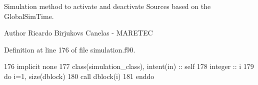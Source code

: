 Simulation method to activate and deactivate Sources based on the GlobalSim\+Time. 

\begin{DoxyAuthor}{Author}
Ricardo Birjukovs Canelas -\/ M\+A\+R\+E\+T\+EC 
\end{DoxyAuthor}


Definition at line 176 of file simulation.\+f90.


\begin{DoxyCode}
176     \textcolor{keywordtype}{implicit none}
177     \textcolor{keywordtype}{class}(simulation\_class), \textcolor{keywordtype}{intent(in)} :: self
178     \textcolor{keywordtype}{integer} :: i
179     \textcolor{keywordflow}{do} i=1, \textcolor{keyword}{size}(dblock)
180         \textcolor{keyword}{call }dblock(i)%
181 \textcolor{keywordflow}{    enddo}
\end{DoxyCode}
